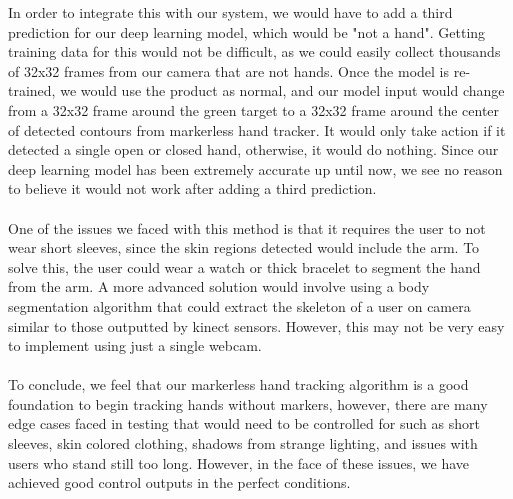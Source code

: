 \documentclass[twoside,twocolumn]{article}
\begin{document}
In order to integrate this with our system, we would have to add a third prediction for our deep learning model, which would be "not a hand". Getting training data for this would not be difficult, as we could easily collect thousands of 32x32 frames from our camera that are not hands. Once the model is re-trained, we would use the product as normal, and our model input would change from a 32x32 frame around the green target to a 32x32 frame around the center of detected contours from markerless hand tracker. It would only take action if it detected a single open or closed hand, otherwise, it would do nothing. Since our deep learning model has been extremely accurate up until now, we see no reason to believe it would not work after adding a third prediction.\\ \\
One of the issues we faced with this method is that it requires the user to not wear short sleeves, since the skin regions detected would include the arm. To solve this, the user could wear a watch or thick bracelet to segment the hand from the arm. A more advanced solution would involve using a body segmentation algorithm that could extract the skeleton of a user on camera similar to those outputted by kinect sensors. However, this may not be very easy to implement using just a single webcam. \\ \\
To conclude, we feel that our markerless hand tracking algorithm is a good foundation to begin tracking hands without markers, however, there are many edge cases faced in testing that would need to be controlled for such as short sleeves, skin colored clothing, shadows from strange lighting, and issues with users who stand still too long. However, in the face of these issues, we have achieved good control outputs in the perfect conditions.
\end{document}

